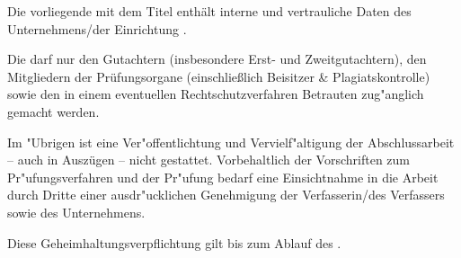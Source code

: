 \begin{sloppypar}

    Die vorliegende \art mit dem Titel \titel enthält interne und vertrauliche Daten des Unternehmens/der Einrichtung \unternehmen.

    Die \art darf nur den Gutachtern (insbesondere Erst- und Zweitgutachtern), den Mitgliedern der Prüfungsorgane (einschlie{\ss}lich Beisitzer \& Plagiatskontrolle) sowie den in einem eventuellen Rechtschutzverfahren Betrauten zug"anglich gemacht werden.

    Im "Ubrigen ist eine Ver"offentlichtung und Vervielf"altigung der Abschlussarbeit -- auch in Auszügen -- nicht gestattet. Vorbehaltlich der Vorschriften zum Pr"ufungsverfahren und der Pr"ufung bedarf eine Einsichtnahme in die Arbeit durch Dritte einer ausdr"ucklichen Genehmigung der Verfasserin/des Verfassers sowie des \oa Unternehmens.

    Diese Geheimhaltungsverpflichtung gilt bis zum Ablauf des \datumAblaufSperrvermerk.
\end{sloppypar}
